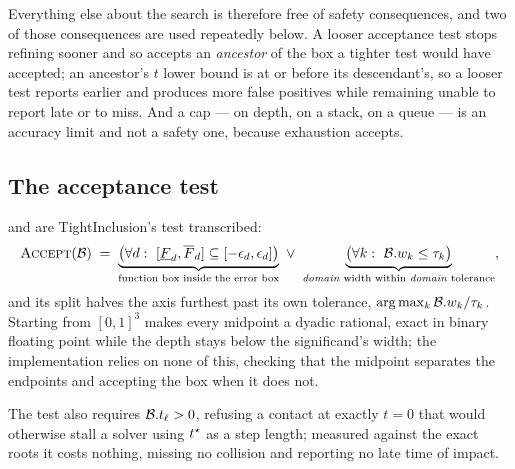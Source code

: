 Everything else about the search is therefore free of safety consequences, and
two of those consequences are used repeatedly below. A looser acceptance test
stops refining sooner and so accepts an \emph{ancestor} of the box a tighter test
would have accepted; an ancestor's $t$ lower bound is at or before its
descendant's, so a looser test reports earlier and produces more false positives
while remaining unable to report late or to miss. And a cap --- on depth, on a
stack, on a queue --- is an accuracy limit and not a safety one, because
exhaustion accepts.

\subsection{The acceptance test}
\label{sec:np:modes}

 and  are TightInclusion's test transcribed:
\begin{equation} \label{eq:accept-tight} \textsc{Accept}(\mathcal{B}) \;=\;
\underbrace{\bigl(\forall d:\ [\underline{F}_{d},\overline{F}_{d}] \subseteq
[-\epsilon_{d},\epsilon_{d}]\bigr)}_{\text{function box inside the error box}}
\ \vee\ \underbrace{\bigl(\forall k:\ \mathcal{B}.w_{k} \le
\tau_{k}\bigr)}_{\text{\emph{domain} width within \emph{domain} tolerance}} ,
\end{equation} and its split halves the axis furthest past its own tolerance,
$\arg\max_{k} \mathcal{B}.w_{k}/\tau_{k}$. Starting from $[0,1]^{3}$ makes every midpoint
a dyadic rational, exact in binary floating point while the depth stays below the
significand's width; the implementation relies on none of this, checking that the
midpoint separates the endpoints and accepting the box when it does not.

The test also requires $\mathcal{B}.t_{\ell} > 0$, refusing a contact at exactly $t=0$
that would otherwise stall a solver using $t^{\star}$ as a step length; measured
against the exact roots it costs nothing, missing no collision and reporting no
late time of impact.

